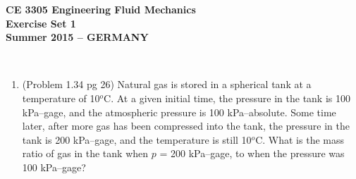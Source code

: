 \documentclass[12pt]{article}
\begin{document}
\begingroup
\begin{center}
{\textbf{{ CE 3305 Engineering Fluid Mechanics} \\ Exercise Set 1 \\ Summer 2015 -- GERMANY} }
\end{center}
\endgroup
\begingroup
~\newline

\begin{enumerate}
\item (Problem 1.34 pg 26)
Natural gas is stored in a spherical tank at a temperature of 10$^o$C.  
At a given initial time, the pressure in the tank is 100 kPa--gage, and the atmospheric pressure is 100 kPa--absolute.  
Some time later, after more gas has been compressed into the tank, the pressure in the tank is 200 kPa--gage, and the temperature is still 10$^o$C.
What is the mass ratio of gas in the tank when $p$ =  200 kPa--gage, to when the pressure was 100 kPa--gage?
\end{enumerate}
\end{document}
